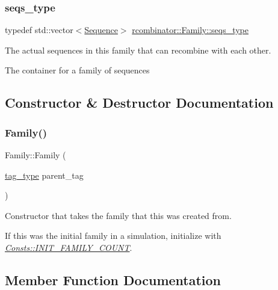 \subsubsection{\texorpdfstring{seqs\+\_\+type}{seqs\_type}}
{\footnotesize\ttfamily typedef std\+::vector$<$\mbox{\hyperlink{classrcombinator_1_1Sequence}{Sequence}}$>$ \mbox{\hyperlink{classrcombinator_1_1Family_abe1bd4ecd0792a403e9a4af26b8e5156}{rcombinator\+::\+Family\+::seqs\+\_\+type}}}



The actual sequences in this family that can recombine with each other. 

The container for a family of sequences 

\subsection{Constructor \& Destructor Documentation}
\mbox{\label{classrcombinator_1_1Family_aefb8619ac695a3ad8e654ed8302668ee}} 
\subsubsection{\texorpdfstring{Family()}{Family()}}
{\footnotesize\ttfamily Family\+::\+Family (\begin{DoxyParamCaption}\item[{\mbox{\hyperlink{constants_8h_a3e6daf1646e952257330d8cfe20e96f8}{tag\+\_\+type}}}]{parent\+\_\+tag }\end{DoxyParamCaption})}



Constructor that takes the family that this was created from. 

If this was the initial family in a simulation, initialize with {\itshape \mbox{\hyperlink{namespacercombinator_1_1Consts_ab7163f2df9e53340e78501c19f9dbe92}{Consts\+::\+I\+N\+I\+T\+\_\+\+F\+A\+M\+I\+L\+Y\+\_\+\+C\+O\+U\+NT}}}. 

\subsection{Member Function Documentation}
\mbox{\label{classrcombinator_1_1Family_a79b180c88225ee52d21da020375d2dfd}} 

